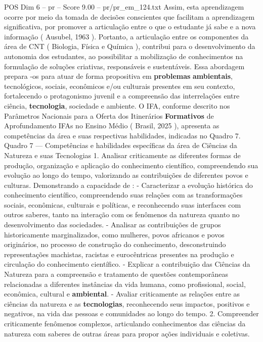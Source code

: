 \begin{textsample}{POS Dim 6 – pr – Score 9.00 – pr/pr\_em\_124.txt}
Assim, esta aprendizagem ocorre por meio da tomada de decisões conscientes que facilitam a aprendizagem significativa, por promover a articulação entre o que o estudante já sabe e a nova informação ( Ausubel, 1963 ).
Portanto, a articulação entre os componentes da área de CNT ( Biologia, Física e Química ), contribui para o desenvolvimento da autonomia dos estudantes, ao possibilitar a mobilização de conhecimentos na formulação de soluções criativas, responsáveis e sustentáveis.
Essa abordagem prepara -os para atuar de forma propositiva em \textbf{problemas} \textbf{ambientais}, tecnológicos, sociais, econômicos e/ou culturais presentes em seu contexto, fortalecendo o protagonismo juvenil e a compreensão das interrelações entre ciência, \textbf{tecnologia}, sociedade e ambiente.
O IFA, conforme descrito nos Parâmetros Nacionais para a Oferta dos Itinerários \textbf{Formativos} de Aprofundamento IFAs no Ensino Médio ( Brasil, 2025 ), apresenta as competências da área e suas respectivas habilidades, indicadas no Quadro 7.
Quadro 7 — Competências e habilidades específicas da área de Ciências da Natureza e suas Tecnologias 1.
Analisar criticamente as diferentes formas de produção, organização e aplicação do conhecimento científico, compreendendo sua evolução ao longo do tempo, valorizando as contribuições de diferentes povos e culturas.
Demonstrando a capacidade de : - Caracterizar a evolução histórica do conhecimento científico, compreendendo suas relações com as transformações sociais, econômicas, culturais e políticas, e reconhecendo suas interfaces com outros saberes, tanto na interação com os fenômenos da natureza quanto no desenvolvimento das sociedades. - Analisar as contribuições de grupos historicamente marginalizados, como mulheres, povos africanos e povos originários, no processo de construção do conhecimento, desconstruindo representações machistas, racistas e eurocêntricas presentes na produção e circulação do conhecimento científico. - Explicar a contribuição das Ciências da Natureza para a compreensão e tratamento de questões contemporâneas relacionadas a diferentes instâncias da vida humana, como profissional, social, econômica, cultural e \textbf{ambiental}. - Avaliar criticamente as relações entre as ciências da natureza e as \textbf{tecnologias}, reconhecendo seus impactos, positivos e negativos, na vida das pessoas e comunidades ao longo do tempo. 2.
Compreender criticamente fenômenos complexos, articulando conhecimentos das ciências da natureza com saberes de outras áreas para propor ações individuais e coletivas.

\end{textsample}
